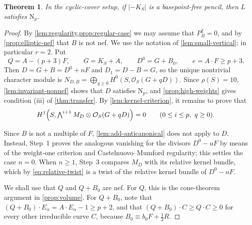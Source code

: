 \documentclass[11pt,reqno]{amsart}
\numberwithin{equation}{section}
\newtheorem{theorem}{Theorem}[section]
\theoremstyle{remark}
\newcommand{\sshf}[1]{\mathcal{O}_{#1}}
\newcommand{\NP}{\mathrm N}
\begin{document}
\begin{theorem}\label{thm:elliptic-complete}
In the cyclic-cover setup, if \(|-K_S|\) is a basepoint-free pencil, then \(L\) satisfies \(\NP_p\).
\end{theorem}

\begin{proof}
By \cref{lem:regularity,prop:regular-case} we may assume that \(P_B^2=0\), and by \cref{prop:elliptic-nef} that \(B\) is not nef. We use the notation of \cref{lem:small-vertical}; in particular \(r=2\). Put
\[
 Q=A-(p+3)F,\qquad G=K_S+A,\qquad D^0=G+B_0,\qquad e=A\cdot F\geq p+3.
\]
Then \(D=G+B=D^0+nF\) and \(D_1=D-B=G\), so the unique nontrivial character module is \(N_{D,B}=\bigoplus_{q\geq0}H^0(S,\sshf{S}(G+qD))\). Since \(\rho(S)=10\), \cref{lem:invariant-nonnef} shows that \(D\) satisfies \(\NP_p\), and \cref{prop:high-weights} gives condition \textup{(iii)} of \cref{thm:transfer}. By \cref{lem:kernel-criterion}, it remains to prove that
\begin{equation}\label{eq:target-vanishing}
 H^1\Bigl(S,\textstyle\bigwedge^{i+1}M_D\otimes\sshf{S}(G+qD)\Bigr)=0
 \qquad(0\leq i\leq p,\ q\geq0).
\end{equation}

Since \(B\) is not a multiple of \(F\), \cref{lem:add-anticanonical} does not apply to \(D\). Instead, Step~1 proves the analogous vanishing for the divisors \(D^0-uF\) by means of the weight-one criterion and Castelnuovo--Mumford regularity; this settles the case \(n=0\). When \(n\geq1\), Step~3 compares \(M_D\) with its relative kernel bundle, which by \eqref{eq:relative-twist} is a twist of the relative kernel bundle of \(D^0-uF\).

We shall use that \(Q\) and \(Q+B_0\) are nef. For \(Q\), this is the cone-theorem argument in \cref{prop:volume}. For \(Q+B_0\), note that \((Q+B_0)\cdot E_\alpha=A\cdot E_\alpha-1\geq p+2\), and that \((Q+B_0)\cdot C\geq Q\cdot C\geq0\) for every other irreducible curve \(C\), because \(B_0\equiv b_0F+\tfrac12R\).


\end{proof}
\end{document}
